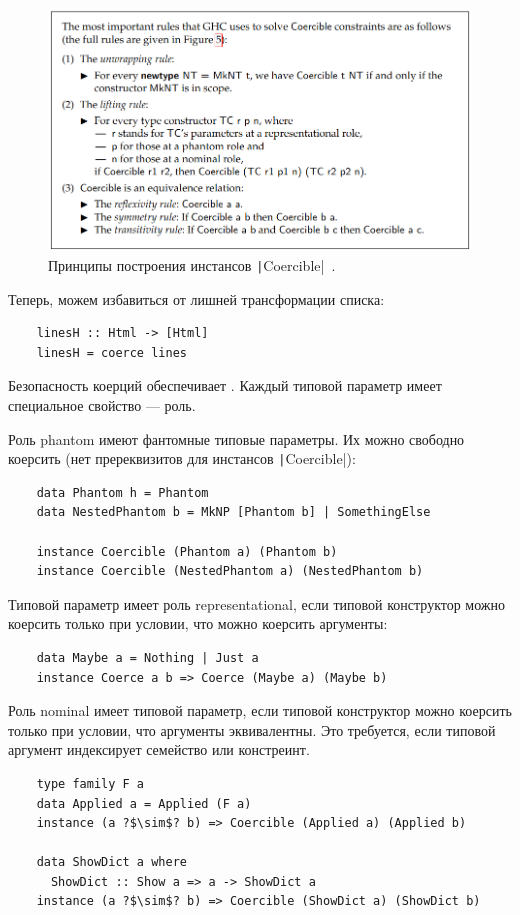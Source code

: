 \begin{figure}[h]
    \centering
    \includegraphics[width=\linewidth]{figs/coersions}
    \caption{Принципы построения инстансов \texttt|Coercible|~\cite{breitner2014safe}.}
    \label{fig:coersions}
\end{figure}

Теперь, можем избавиться от лишней трансформации списка:
\begin{verbatim}
    linesH :: Html -> [Html]
    linesH = coerce lines
\end{verbatim}

Безопасность коерций обеспечивает .
Каждый типовой параметр имеет специальное свойство --- роль.

Роль phantom имеют фантомные типовые параметры.
Их можно свободно коерсить (нет пререквизитов для инстансов \texttt|Coercible|):
\begin{verbatim}
    data Phantom h = Phantom
    data NestedPhantom b = MkNP [Phantom b] | SomethingElse

    instance Coercible (Phantom a) (Phantom b)
    instance Coercible (NestedPhantom a) (NestedPhantom b)
\end{verbatim}

Типовой параметр имеет роль representational, если типовой конструктор можно коерсить только при условии, что можно коерсить аргументы:
\begin{verbatim}
    data Maybe a = Nothing | Just a
    instance Coerce a b => Coerce (Maybe a) (Maybe b)
\end{verbatim}

Роль nominal имеет типовой параметр, если типовой конструктор можно коерсить только при условии, что аргументы эквивалентны.
Это требуется, если типовой аргумент индексирует семейство или констреинт.
\begin{verbatim}
    type family F a
    data Applied a = Applied (F a)
    instance (a ?$\sim$? b) => Coercible (Applied a) (Applied b)

    data ShowDict a where
      ShowDict :: Show a => a -> ShowDict a
    instance (a ?$\sim$? b) => Coercible (ShowDict a) (ShowDict b)
\end{verbatim}

